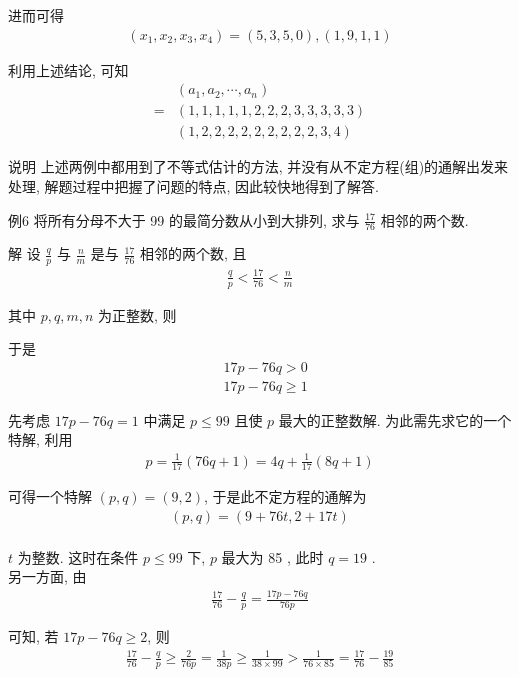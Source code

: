 	进而可得
\begin{align*}
		\left(x_{1}, x_{2}, x_{3}, x_{4}\right)=(5,3,5,0),(1,9,1,1)
	\end{align*}

	利用上述结论, 可知\begin{align}
		  & \left(a_{1}, a_{2}, \cdots, a_{n}\right) \\
		= & (1,1,1,1,1,2,2,2,3,3,3,3,3)              \\
		  & (1,2,2,2,2,2,2,2,2,2,3,4)
	\end{align}

	说明 上述两例中都用到了不等式估计的方法, 并没有从不定方程(组)的通解出发来处理, 解题过程中把握了问题的特点, 因此较快地得到了解答.

	例6 将所有分母不大于 99 的最简分数从小到大排列, 求与 $\frac{17}{76}$ 相邻的两个数.

	解 设 $\frac{q}{p}$ 与 $\frac{n}{m}$ 是与 $\frac{17}{76}$ 相邻的两个数, 且
\begin{align*}
		\frac{q}{p}<\frac{17}{76}<\frac{n}{m}
	\end{align*}

	其中 $p ,  q ,  m ,  n$ 为正整数, 则

	于是\begin{align}
		 & 17 p-76 q>0           \\
		 & 17 p-76 q \geqslant 1
	\end{align}

	先考虑 $17 p-76 q=1$ 中满足 $p \leqslant 99$ 且使 $p$ 最大的正整数解. 为此需先求它的一个特解, 利用
\begin{align*}
		p=\frac{1}{17}(76 q+1)=4 q+\frac{1}{17}(8 q+1)
	\end{align*}

	可得一个特解 $(p, q)=(9,2)$, 于是此不定方程的通解为
\begin{align*}
		(p, q)=(9+76 t, 2+17 t)
	\end{align*}\\
$t$ 为整数. 这时在条件 $p \leqslant 99$ 下, $p$ 最大为 85 , 此时 $q=19$ . \\
	另一方面, 由
\begin{align*}
		\frac{17}{76}-\frac{q}{p}=\frac{17 p-76 q}{76 p}
	\end{align*}

	可知, 若 $17 p-76 q \geqslant 2$, 则
\begin{align*}
		\frac{17}{76}-\frac{q}{p} \geqslant \frac{2}{76 p}=\frac{1}{38 p} \geqslant \frac{1}{38 \times 99}>\frac{1}{76 \times 85}=\frac{17}{76}-\frac{19}{85}
	\end{align*}

